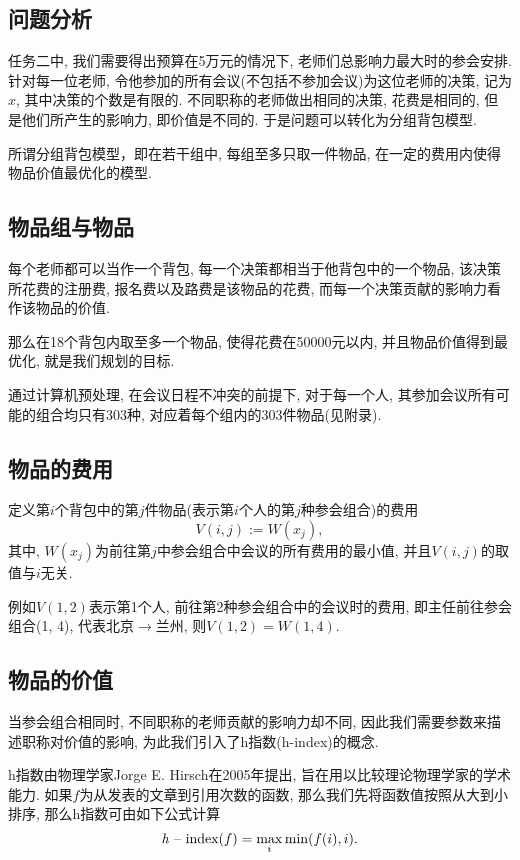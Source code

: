 \subsection{问题分析}
    任务二中, 我们需要得出预算在5万元的情况下, 老师们总影响力最大时的参会安排.
    针对每一位老师, 令他参加的所有会议(不包括不参加会议)为这位老师的决策, 记为$x$,
    其中决策的个数是有限的.
    不同职称的老师做出相同的决策, 花费是相同的, 但是他们所产生的影响力, 即价值是不同的.
    于是问题可以转化为分组背包模型.
    
    所谓分组背包模型，即在若干组中, 每组至多只取一件物品, 在一定的费用内使得物品价值最优化的模型.
    
\subsection{物品组与物品}
    每个老师都可以当作一个背包, 每一个决策都相当于他背包中的一个物品,
    该决策所花费的注册费, 报名费以及路费是该物品的花费,
    而每一个决策贡献的影响力看作该物品的价值.

    那么在18个背包内取至多一个物品, 使得花费在50000元以内, 并且物品价值得到最优化,
    就是我们规划的目标.

    通过计算机预处理, 在会议日程不冲突的前提下, 对于每一个人, 其参加会议所有可能的组合均只有303种, 对应着每个组内的303件物品(见附录).
    
\subsection{物品的费用}
    定义第$i$个背包中的第$j$件物品(表示第$i$个人的第$j$种参会组合)的费用
    \[V(i, j):=W(x_{j}),\]
    其中, $W(x_{j})$为前往第$j$中参会组合中会议的所有费用的最小值, 并且$V(i, j)$的取值与$i$无关.

    例如$V(1 ,2)$表示第1个人, 前往第2种参会组合中的会议时的费用,
    即主任前往参会组合(1, 4), 代表北京$\rightarrow$兰州,
    则$V(1, 2)=W(1, 4).$
    
\subsection{物品的价值}
    当参会组合相同时, 不同职称的老师贡献的影响力却不同, 因此我们需要参数来描述职称对价值的影响,
    为此我们引入了h指数(h-index)的概念.
    
    h指数由物理学家Jorge E. Hirsch在2005年提出, 旨在用以比较理论物理学家的学术能力.\citep{J.E.Hirsch_2005}
    如果$f$为从发表的文章到引用次数的函数, 那么我们先将函数值按照从大到小排序, 那么h指数可由如下公式计算
    \citep{wiki_h-index}
    \[\text{\textit{h} -- index} (f) = {\displaystyle \max _{i}\min(f(i),i)}.\]
    
